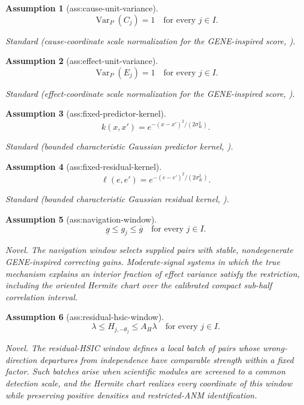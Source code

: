 \documentclass{article}
\newtheorem{assumption}{Assumption}
\begin{document}
\begin{assumption}[ass:cause-unit-variance]\label{ass:cause-unit-variance}
\[
\operatorname{Var}_P(C_j)=1\quad\text{for every }j\in I.
\]
\par\smallskip\noindent\emph{Standard} (cause-coordinate scale normalization for the GENE-inspired score, \cite{pmlr-v267-li25bx}).
\end{assumption}

\begin{assumption}[ass:effect-unit-variance]\label{ass:effect-unit-variance}
\[
\operatorname{Var}_P(E_j)=1\quad\text{for every }j\in I.
\]
\par\smallskip\noindent\emph{Standard} (effect-coordinate scale normalization for the GENE-inspired score, \cite{pmlr-v267-li25bx}).
\end{assumption}

\begin{assumption}[ass:fixed-predictor-kernel]\label{ass:fixed-predictor-kernel}
\[k(x,x')=e^{-(x-x')^2/(2\sigma_K^2)}.\]
\par\smallskip\noindent\emph{Standard} (bounded characteristic Gaussian predictor kernel, \cite{GrettonBSS05}).
\end{assumption}

\begin{assumption}[ass:fixed-residual-kernel]\label{ass:fixed-residual-kernel}
\[\ell(e,e')=e^{-(e-e')^2/(2\sigma_K^2)}.\]
\par\smallskip\noindent\emph{Standard} (bounded characteristic Gaussian residual kernel, \cite{GrettonBSS05}).
\end{assumption}

\begin{assumption}[ass:navigation-window]\label{ass:navigation-window}
\[
\underline g\le g_j\le\overline g\quad\text{for every }j\in I.
\]
\par\smallskip\noindent\emph{Novel.} The navigation window selects supplied pairs with stable, nondegenerate GENE-inspired correcting gains. Moderate-signal systems in which the true mechanism explains an interior fraction of effect variance satisfy the restriction, including the oriented Hermite chart over the calibrated compact sub-half correlation interval.
\end{assumption}

\begin{assumption}[ass:residual-hsic-window]\label{ass:residual-hsic-window}
\[\lambda\le H_{j,-\theta_j}\le A_H\lambda\quad\text{for every }j\in I.\]
\par\smallskip\noindent\emph{Novel.} The residual-HSIC window defines a local batch of pairs whose wrong-direction departures from independence have comparable strength within a fixed factor. Such batches arise when scientific modules are screened to a common detection scale, and the Hermite chart realizes every coordinate of this window while preserving positive densities and restricted-ANM identification.
\end{assumption}
\end{document}
